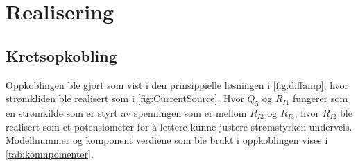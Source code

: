 \newpage
\section{Realisering}
\label{realiseringOgTest}

\subsection{Kretsopkobling}
Oppkoblingen ble gjort som vist i den prinsippielle løsningen i \autoref{fig:diffamp}, hvor strømkliden ble realisert som i \autoref{fig:CurrentSource}. Hvor $Q_5$ og $R_{I1}$ fungerer som en strømkilde som er styrt av spenningen som er mellom $R_{I2}$ og $R_{I3}$, hvor $R_{I2}$ ble realisert som et potensiometer for å lettere kunne justere strømstyrken underveis. Modellnummer og komponent verdiene som ble brukt i oppkoblingen vises i \autoref{tab:komnpomenter}.  

